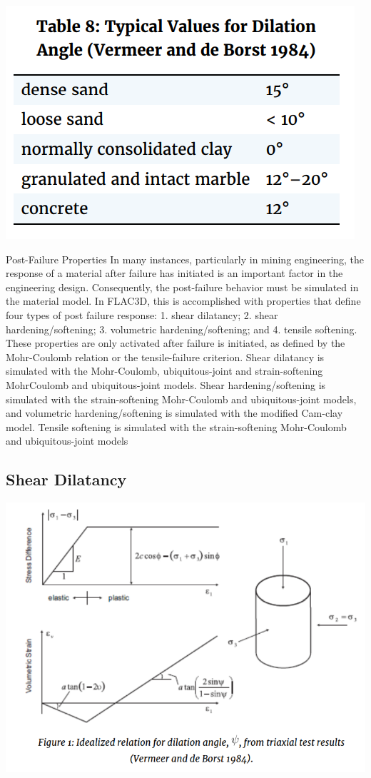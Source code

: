 \documentclass[a4paper, nobind]{templates/ociamthesis}
\begin{document}
\includegraphics[width=1\linewidth]{myfigureeeeee/typical_dilation}

Post-Failure Properties In many instances, particularly in mining
engineering, the response of a material after failure has initiated is
an important factor in the engineering design. Consequently, the
post-failure behavior must be simulated in the material model. In
FLAC3D, this is accomplished with properties that define four types of
post failure response: 1. shear dilatancy; 2. shear hardening/softening;
3. volumetric hardening/softening; and 4. tensile softening. These
properties are only activated after failure is initiated, as defined by
the Mohr-Coulomb relation or the tensile-failure criterion. Shear
dilatancy is simulated with the Mohr-Coulomb, ubiquitous-joint and
strain-softening MohrCoulomb and ubiquitous-joint models. Shear
hardening/softening is simulated with the strain-softening Mohr-Coulomb
and ubiquitous-joint models, and volumetric hardening/softening is
simulated with the modified Cam-clay model. Tensile softening is
simulated with the strain-softening Mohr-Coulomb and ubiquitous-joint
models

\hypertarget{shear-dilatancy}{%
\subsection{Shear Dilatancy}\label{shear-dilatancy}}

\includegraphics[width=1\linewidth]{myfigureeeeee/dil}
\end{document}
